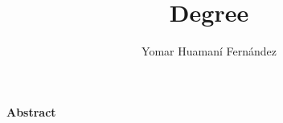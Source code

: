 \documentclass[12pt,a4paper,openany]{book}
\author{Yomar Huaman\'{i} Fern\'{a}ndez}
\title{Degree}
\makeatletter
\newcommand\abstractname{Abstract}  %
\newenvironment{abstract}{%
	\titlepage
	\null\vfil
	\@beginparpenalty\@lowpenalty
	\begin{center}%
		\bfseries \abstractname
		\@endparpenalty\@M
	\end{center}}%
	{\par\vfil\null
	\endtitlepage}
\newenvironment{abstract}{%
	\if@twocolumn
	\section*{\abstractname}%
	\else
	\small
	\begin{center}%
		{\bfseries \abstractname\vspace{25em}\vspace{\z@}}%
	\end{center}%
	\quotation
	\fi}
{\if@twocolumn\else\endquotation\fi}
\makeatother
\begin{document}
	
	\frontmatter
		
		
		\begin{titlepage}
			\begin{abstract}
				\lipsum[1]
			\end{abstract}
		\end{titlepage}
		
		
		
		
		\tableofcontents
		\listoffigures
		\listoftables
	\mainmatter
	
			
		 
		
		 \cite{jhonson-2}
	\backmatter
	
	
\end{document}
